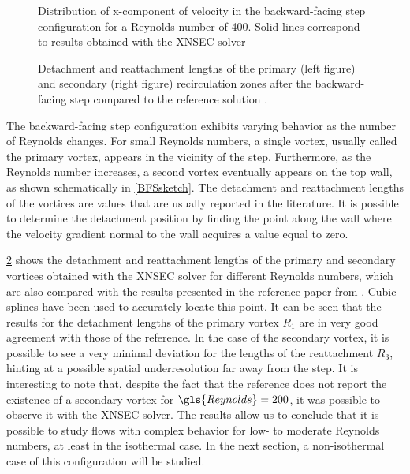 \begin{figure}[bt]
	\centering
	\caption{Distribution of x-component of velocity in the backward-facing step configuration for a Reynolds number of 400. Solid lines correspond to results obtained with the XNSEC solver}
	\label{fig:uvelBFS}
\end{figure}



\begin{figure}[tb]
	\centering
	\caption{ Detachment and reattachment lengths of the primary (left figure) and secondary (right figure) recirculation zones after the backward-facing step compared to the reference solution \citep{biswasBackwardFacingStepFlows2004}.}
	\label{fig:Re_De_Attachmentlengths}
\end{figure}
The backward-facing step configuration exhibits varying behavior as the number of Reynolds changes. For small Reynolds numbers, a single vortex, usually called the primary vortex, appears in the vicinity of the step. Furthermore, as the Reynolds number increases, a second vortex eventually appears on the top wall, as shown schematically in \cref{BFSsketch}.
The detachment and reattachment lengths of the vortices are values that are usually reported in the literature. It is possible to determine the detachment position by finding the point along the wall where the velocity gradient normal to the wall acquires a value equal to zero. 

\cref{fig:Re_De_Attachmentlengths} shows the detachment and reattachment lengths of the primary and secondary vortices obtained with the XNSEC solver for different Reynolds numbers, which are also compared with the results presented in the reference paper from \cite{biswasBackwardFacingStepFlows2004}. Cubic splines have been used to accurately locate this point. It can be seen that the results for the detachment lengths of the primary vortex $R_1$ are in very good agreement with those of the reference. In the case of the secondary vortex, it is possible to see a very minimal deviation for the lengths of the reattachment $R_3$, hinting at a possible spatial underresolution far away from the step. It is interesting to note that, despite the fact that the reference does not report the existence of a secondary vortex for $\gls{Reynolds} = 200$, it was possible to observe it with the XNSEC-solver. The results allow us to conclude that it is possible to study flows with complex behavior for low- to moderate Reynolds numbers, at least in the isothermal case. In the next section, a non-isothermal case of this configuration will be studied.


